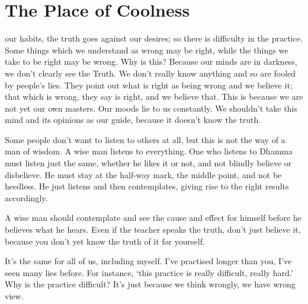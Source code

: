 

\chapter{The Place of Coolness}

 our habits, the truth goes against our desires; so there is difficulty in the practice. Some things which we understand as wrong may be right, while the things we take to be right may be wrong. Why is this? Because our minds are in darkness, we don't clearly see the Truth. We don't really know anything and so are fooled by people's lies. They point out what is right as being wrong and we believe it; that which is wrong, they say is right, and we believe that. This is because we are not yet our own masters. Our moods lie to us constantly. We shouldn't take this mind and its opinions as our guide, because it doesn't know the truth. 

Some people don't want to listen to others at all, but this is not the way of a man of wisdom. A wise man listens to everything. One who listens to Dhamma must listen just the same, whether he likes it or not, and not blindly believe or disbelieve. He must stay at the half-way mark, the middle point, and not be heedless. He just listens and then contemplates, giving rise to the right results accordingly. 

A wise man should contemplate and see the cause and effect for himself before he believes what he hears. Even if the teacher speaks the truth, don't just believe it, because you don't yet know the truth of it for yourself. 

It's the same for all of us, including myself. I've practised longer than you, I've seen many lies before. For instance, `this practice is really difficult, really hard.' Why is the practice difficult? It's just because we think wrongly, we have wrong view. 

